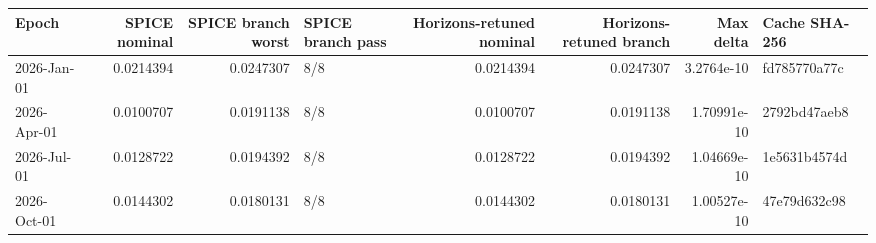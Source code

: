 \begin{tabular}{lrrlrrrl}
\toprule
Epoch & SPICE nominal & SPICE branch worst & SPICE branch pass & Horizons-retuned nominal & Horizons-retuned branch & Max delta & Cache SHA-256 \\
\midrule
2026-Jan-01 & 0.0214394 & 0.0247307 & 8/8 & 0.0214394 & 0.0247307 & 3.2764e-10 & fd785770a77c \\
2026-Apr-01 & 0.0100707 & 0.0191138 & 8/8 & 0.0100707 & 0.0191138 & 1.70991e-10 & 2792bd47aeb8 \\
2026-Jul-01 & 0.0128722 & 0.0194392 & 8/8 & 0.0128722 & 0.0194392 & 1.04669e-10 & 1e5631b4574d \\
2026-Oct-01 & 0.0144302 & 0.0180131 & 8/8 & 0.0144302 & 0.0180131 & 1.00527e-10 & 47e79d632c98 \\
\bottomrule
\end{tabular}
